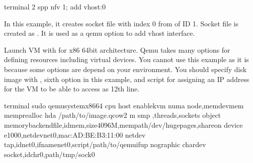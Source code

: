 \documentclass[a4paper,11pt,openany,oneside,english]{sphinxmanual}
\begin{document}
\begin{sphinxVerbatim}[commandchars=\\\{\},formatcom=\footnotesize]
\PYGZsh{} terminal 2
spp \PYGZgt{} nfv 1; add vhost:0
\end{sphinxVerbatim}

In this example, it creates socket file with index 0 from  of ID 1.
Socket file is created as .
It is used as a qemu option to add vhost interface.

Launch VM with  for x86 64bit architecture.
Qemu takes many options for defining resources including virtual
devices. You cannot use this example as it is because some options are
depend on your environment.
You should specify disk image with , sixth option in this
example, and  script for assigning an IP address for the VM
to be able to access as 12th line.

\begin{sphinxVerbatim}[commandchars=\\\{\},formatcom=\footnotesize]
 terminal 
 sudo qemu\PYGZhy{}system\PYGZhy{}x86\PYGZus{}64 
    \PYGZhy{}cpu host 
    \PYGZhy{}enable\PYGZhy{}kvm 
    \PYGZhy{}numa node,memdevmem 
    \PYGZhy{}mem\PYGZhy{}prealloc 
    \PYGZhy{}hda /path/to/image.qcow2 
    \PYGZhy{}m  
    \PYGZhy{}smp ,threads,sockets 
    \PYGZhy{}object 
    memory\PYGZhy{}backend\PYGZhy{}file,idmem,size4096M,mem\PYGZhy{}path/dev/hugepages,shareon 
    \PYGZhy{}device e1000,netdevnet0,mac:AD:BE:B3:11:00 
    \PYGZhy{}netdev tap,idnet0,ifnamenet0,script/path/to/qemu\PYGZhy{}ifup 
    \PYGZhy{}nographic 
    \PYGZhy{}chardev socket,idchr0,path/tmp/sock0  
\end{sphinxVerbatim}
\end{document}
